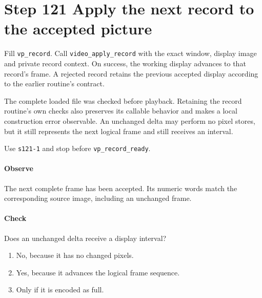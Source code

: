 \section{Step 121 Apply the next record to the accepted picture}
Fill \texttt{vp\_record}. Call \texttt{video\_apply\_record} with the exact window, display image and private record context. On success, the working display advances to that record's frame. A rejected record retains the previous accepted display according to the earlier routine's contract.

The complete loaded file was checked before playback. Retaining the record routine's own checks also preserves its callable behavior and makes a local construction error observable. An unchanged delta may perform no pixel stores, but it still represents the next logical frame and still receives an interval.

Use \texttt{s121-1} and stop before \texttt{vp\_record\_ready}.

\paragraph{Observe} The next complete frame has been accepted. Its numeric words match the corresponding source image, including an unchanged frame.

\paragraph{Check} Does an unchanged delta receive a display interval?
\begin{enumerate}[label=\Alph*.]
  \item No, because it has no changed pixels.
  \item Yes, because it advances the logical frame sequence.
  \item Only if it is encoded as full.
\end{enumerate}
